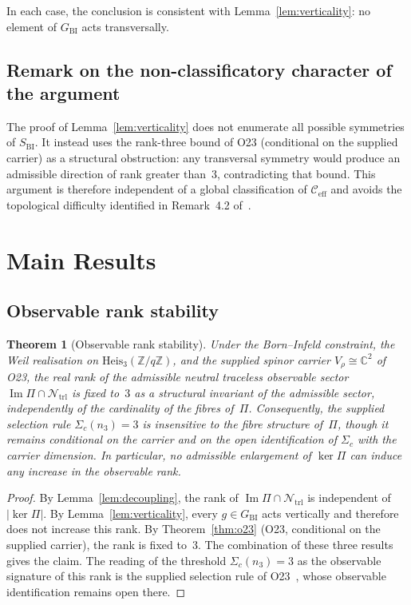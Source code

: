 \documentclass[11pt,a4paper]{article}
\newtheorem{theorem}{Theorem}[section]
\newcommand{\Ntrl}{\mathcal{N}_{\mathrm{trl}}}
\newcommand{\GBI}{G_{\mathrm{BI}}}
\newcommand{\SBI}{S_{\mathrm{BI}}}
\begin{document}
        In each case, the conclusion is consistent with Lemma~\ref{lem:verticality}: no element of
        $\GBI$ acts transversally.

  \subsection{Remark on the non-classificatory character of the argument}
    \label{sec:nonclassif}

    The proof of Lemma~\ref{lem:verticality} does not enumerate all possible symmetries of
    $\SBI$.
    It instead uses the rank-three bound of O23 (conditional on the supplied carrier) as a
    structural obstruction: any transversal symmetry
    would produce an admissible direction of rank greater than~$3$, contradicting that bound.
    This argument is therefore independent of a global classification of $\mathcal{C}_{\mathrm{eff}}$
    and avoids the topological difficulty identified in Remark~4.2 of~\cite{Beau2026k}.

  \section{Main Results}
  \label{sec:main}

  \subsection{Observable rank stability}
    \label{sec:rankstability}

    \begin{theorem}[Observable rank stability]
      \label{thm:rankstability}
      Under the Born--Infeld constraint, the Weil realisation on
      $\mathrm{Heis}_3(\mathbb{Z}/q\mathbb{Z})$, and the supplied spinor carrier
      $V_\rho \cong \mathbb{C}^2$ of O23, the real rank of the admissible neutral traceless
      observable sector $\operatorname{Im}\Pi \cap \Ntrl$ is fixed to~$3$ as a structural invariant of
      the admissible sector, independently of the cardinality of the fibres of~$\Pi$.
      Consequently, the supplied selection rule $\Sigma_c(n_3) = 3$ is insensitive to the fibre
      structure of~$\Pi$, though it remains conditional on the carrier and on the open
      identification of $\Sigma_c$ with the carrier dimension.
      In particular, no admissible enlargement of $\ker\Pi$ can induce any increase in the
      observable rank.
    \end{theorem}

    \begin{proof}
      By Lemma~\ref{lem:decoupling}, the rank of $\operatorname{Im}\Pi \cap \Ntrl$ is independent of
      $|\ker\Pi|$.
      By Lemma~\ref{lem:verticality}, every $g \in \GBI$ acts vertically and therefore does not
      increase this rank.
      By Theorem~\ref{thm:o23} (O23, conditional on the supplied carrier), the rank is fixed
      to~$3$.
      The combination of these three results gives the claim.
      The reading of the threshold $\Sigma_c(n_3) = 3$ as the observable signature of this rank
      is the supplied selection rule of O23~\cite{Beau2026a27}, whose observable identification
      remains open there.
    \end{proof}
\end{document}
